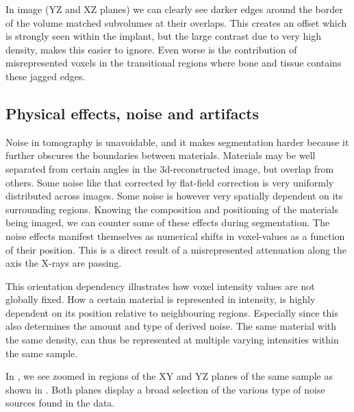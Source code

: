 In image  (YZ and XZ planes) we can clearly see darker edges around the border
of the volume matched subvolumes at their overlaps. This creates an offset which is strongly seen
within the implant, but the large contrast due to very high density, makes this easier to ignore.
Even worse is the contribution of misrepresented voxels in the transitional regions where bone and
tissue contains these jagged edges.

\subsection{Physical effects, noise and artifacts}
\label{sec:physics}

Noise in tomography is unavoidable, and it makes segmentation harder because it further obscures
the boundaries between materials. Materials may be well separated from certain angles in the
3d-reconstructed image, but overlap from others. Some noise like that corrected by flat-field
correction is very uniformly distributed across images. Some noise is however very spatially
dependent on its surrounding regions. Knowing the composition and positioning of the materials
being imaged, we can counter some of these effects during segmentation. The noise effects manifest
themselves as numerical shifts in voxel-values as a function of their position. This is a direct
result of a misrepresented attenuation along the axis the X-rays are passing.

This orientation dependency illustrates how voxel intensity values are not globally fixed. How a
certain material is represented in intensity, is highly dependent on its position relative to
neighbouring regions. Especially since this also determines the amount and type of derived noise.
The same material with the same density, can thus be represented at multiple varying intensities
within the same sample.


In , we see zoomed in regions of the XY and YZ planes
of the same sample as shown in .
Both planes display a broad selection of the various type of noise sources found in the data.

